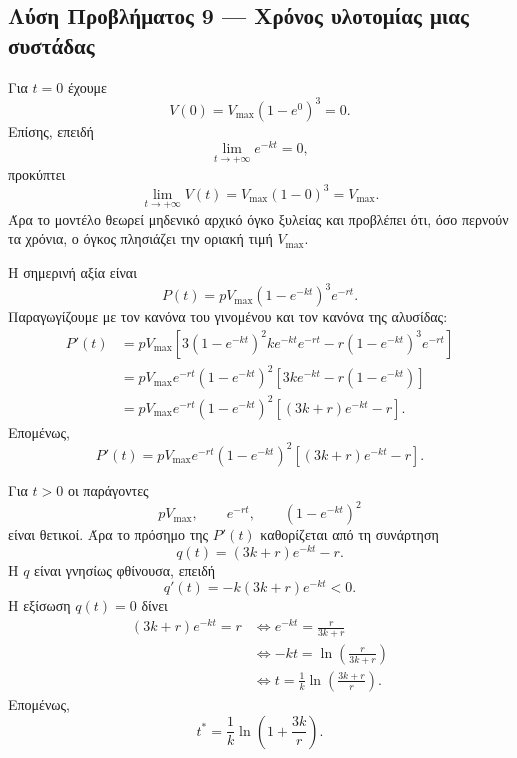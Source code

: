 \subsection*{Λύση Προβλήματος 9 --- Χρόνος υλοτομίας μιας συστάδας}

\begin{alist}
  \item Για $t=0$ έχουμε
        \[
          V(0)=V_{\max}(1-e^0)^3=0.
        \]
        Επίσης, επειδή
        \[
          \lim_{t\to+\infty}e^{-kt}=0,
        \]
        προκύπτει
        \[
          \lim_{t\to+\infty}V(t)
          =V_{\max}(1-0)^3
          =V_{\max}.
        \]
        Άρα το μοντέλο θεωρεί μηδενικό αρχικό όγκο ξυλείας και προβλέπει
        ότι, όσο περνούν τα χρόνια, ο όγκος πλησιάζει την οριακή τιμή
        $V_{\max}$.

  \item Η σημερινή αξία είναι
        \[
          P(t)=pV_{\max}(1-e^{-kt})^3e^{-rt}.
        \]
        Παραγωγίζουμε με τον κανόνα του γινομένου και τον κανόνα της
        αλυσίδας:
        \begin{align*}
          P'(t)
          &=pV_{\max}\left[
             3(1-e^{-kt})^2ke^{-kt}e^{-rt}
             -r(1-e^{-kt})^3e^{-rt}
             \right]\\
          &=pV_{\max}e^{-rt}(1-e^{-kt})^2
             \left[3ke^{-kt}-r(1-e^{-kt})\right]\\
          &=pV_{\max}e^{-rt}(1-e^{-kt})^2
             \left[(3k+r)e^{-kt}-r\right].
        \end{align*}
        Επομένως,
        \[
          {
          P'(t)=pV_{\max}e^{-rt}(1-e^{-kt})^2
          \left[(3k+r)e^{-kt}-r\right]}.
        \]

  \item Για $t>0$ οι παράγοντες
        \[
          pV_{\max},\qquad e^{-rt},
          \qquad (1-e^{-kt})^2
        \]
        είναι θετικοί. Άρα το πρόσημο της $P'(t)$ καθορίζεται από τη
        συνάρτηση
        \[
          q(t)=(3k+r)e^{-kt}-r.
        \]
        Η $q$ είναι γνησίως φθίνουσα, επειδή
        \[
          q'(t)=-k(3k+r)e^{-kt}<0.
        \]
        Η εξίσωση $q(t)=0$ δίνει
        \begin{align*}
          (3k+r)e^{-kt}=r
          &\Longleftrightarrow
          e^{-kt}=\frac{r}{3k+r}\\
          &\Longleftrightarrow
          -kt=\ln\left(\frac{r}{3k+r}\right)\\
          &\Longleftrightarrow
          t=\frac{1}{k}
          \ln\left(\frac{3k+r}{r}\right).
        \end{align*}
        Επομένως,
        \[
          {
          t^*=\frac{1}{k}\ln\left(1+\frac{3k}{r}\right)}.
        \]


\end{alist}
